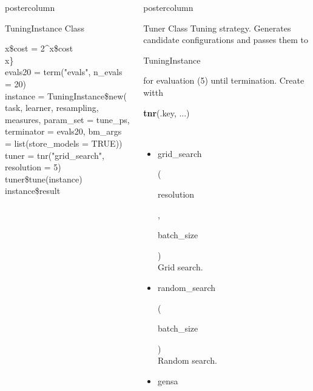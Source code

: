 \documentclass{beamer}
\newlength{\columnheight} %
\newcommand{\codeinline}[1]{\begin{codeboxinline}#1\end{codeboxinline}}
\begin{document}
\begin{frame}[fragile]{}
\begin{columns}
\begin{column}{.245\textwidth}
\begin{beamercolorbox}[center]{postercolumn}
\begin{minipage}{.98\textwidth}
{\begin{myblock}{TuningInstance Class}
\begin{codeboxexample}
{									\hspace*{1ex} x\$cost = 2\textasciicircum x\$cost\\
									\hspace*{1ex} x\}\\
									evals20 = term("evals", n\_evals = 20)
									\vspace{1em}
									\\
									instance = TuningInstance\$new(\\
									\hspace*{1ex} task, learner, resampling, measures, param\_set = tune\_ps,\\
									\hspace*{1ex} terminator = evals20, bm\_args = list(store\_models = TRUE))\\
									tuner = tnr("grid\_search", resolution = 5)
									\vspace{1em}
									\\
									tuner\$tune(instance)\\
									instance\$result}
							\end{codeboxexample}
						\end{myblock}
						\vfill}
				\end{minipage}
			\end{beamercolorbox}
		\end{column}
		\begin{column}{.245\textwidth}
			\begin{beamercolorbox}[center]{postercolumn}
				\begin{minipage}{.98\textwidth}
					\parbox[t][\columnheight]{\textwidth}{
						\begin{myblock}{Tuner Class}
                            Tuning strategy. Generates candidate configurations 
                            and passes them to \codeinline{TuningInstance} for evaluation (5) until termination. 
                            Create witth \codeinline{\textbf{tnr}(.key, ...)}
							\\
							\begin{itemize}
								\item \codeinline{grid\_search}
								(\codeinline{resolution}, \codeinline{batch\_size})\\
								Grid search.
								\item \codeinline{random\_search}
								(\codeinline{batch\_size})\\
								Random search.
								\item \codeinline{gensa}

\end{itemize}
\end{myblock}}
\end{minipage}
\end{beamercolorbox}
\end{column}
\end{columns}
\end{frame}
\end{document}
